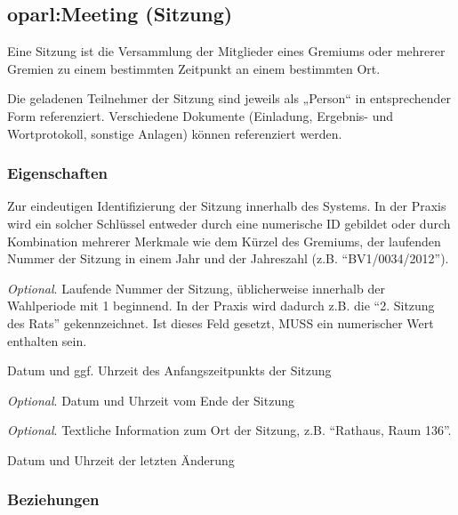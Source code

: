 \documentclass[,a4paper]{article}
\begin{document}
\subsection{oparl:Meeting (Sitzung)}\label{oparlux5fmeeting}

Eine Sitzung ist die Versammlung der Mitglieder eines Gremiums oder
mehrerer Gremien zu einem bestimmten Zeitpunkt an einem bestimmten Ort.

Die geladenen Teilnehmer der Sitzung sind jeweils als „Person`` in
entsprechender Form referenziert. Verschiedene Dokumente (Einladung,
Ergebnis- und Wortprotokoll, sonstige Anlagen) können referenziert
werden.

\subsubsection{Eigenschaften}\label{eigenschaften-4}

\begin{description}
\itemsep1pt\parskip0pt
\item[Schlüssel (\texttt{id})]
Zur eindeutigen Identifizierung der Sitzung innerhalb des Systems. In
der Praxis wird ein solcher Schlüssel entweder durch eine numerische ID
gebildet oder durch Kombination mehrerer Merkmale wie dem Kürzel des
Gremiums, der laufenden Nummer der Sitzung in einem Jahr und der
Jahreszahl (z.B. ``BV1/0034/2012'').
\item[Nummer (\texttt{sequence\_number})]
\emph{Optional}. Laufende Nummer der Sitzung, üblicherweise innerhalb
der Wahlperiode mit 1 beginnend. In der Praxis wird dadurch z.B. die
``2. Sitzung des Rats'' gekennzeichnet. Ist dieses Feld gesetzt, MUSS
ein numerischer Wert enthalten sein.
\item[Anfang (\texttt{start})]
Datum und ggf. Uhrzeit des Anfangszeitpunkts der Sitzung
\item[Ende (\texttt{end})]
\emph{Optional}. Datum und Uhrzeit vom Ende der Sitzung
\item[Ort (\texttt{address})]
\emph{Optional}. Textliche Information zum Ort der Sitzung, z.B.
``Rathaus, Raum 136''.
\item[Zuletzt geändert (\texttt{last\_modified})]
Datum und Uhrzeit der letzten Änderung
\end{description}

\subsubsection{Beziehungen}\label{beziehungen-3}
\end{document}
